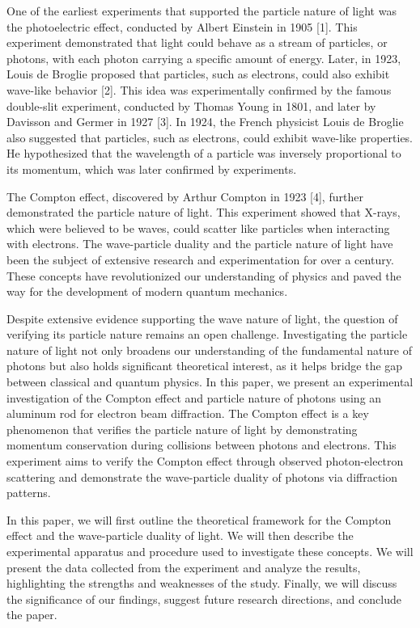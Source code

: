 One of the earliest experiments that supported the particle nature of light was the photoelectric effect, conducted by Albert Einstein in 1905 [1]. This experiment demonstrated that light could behave as a stream of particles, or photons, with each photon carrying a specific amount of energy.
Later, in 1923, Louis de Broglie proposed that particles, such as electrons, could also exhibit wave-like behavior [2]. This idea was experimentally confirmed by the famous double-slit experiment, conducted by Thomas Young in 1801, and later by Davisson and Germer in 1927 [3].
In 1924, the French physicist Louis de Broglie also suggested that particles, such as electrons, could exhibit wave-like properties. He hypothesized that the wavelength of a particle was inversely proportional to its momentum, which was later confirmed by experiments.

The Compton effect, discovered by Arthur Compton in 1923 [4], further demonstrated the particle nature of light. This experiment showed that X-rays, which were believed to be waves, could scatter like particles when interacting with electrons.
The wave-particle duality and the particle nature of light have been the subject of extensive research and experimentation for over a century. These concepts have revolutionized our understanding of physics and paved the way for the development of modern quantum mechanics.

Despite extensive evidence supporting the wave nature of light, the question of verifying its particle nature remains an open challenge. Investigating the particle nature of light not only broadens our understanding of the fundamental nature of photons but also holds significant theoretical interest, as it helps bridge the gap between classical and quantum physics.
In this paper, we present an experimental investigation of the Compton effect and particle nature of photons using an aluminum rod for electron beam diffraction. The Compton effect is a key phenomenon that verifies the particle nature of light by demonstrating momentum conservation during collisions between photons and electrons. This experiment aims to verify the Compton effect through observed photon-electron scattering and demonstrate the wave-particle duality of photons via diffraction patterns.

In this paper, we will first outline the theoretical framework for the Compton effect and the wave-particle duality of light. We will then describe the experimental apparatus and procedure used to investigate these concepts. We will present the data collected from the experiment and analyze the results, highlighting the strengths and weaknesses of the study. Finally, we will discuss the significance of our findings, suggest future research directions, and conclude the paper.


